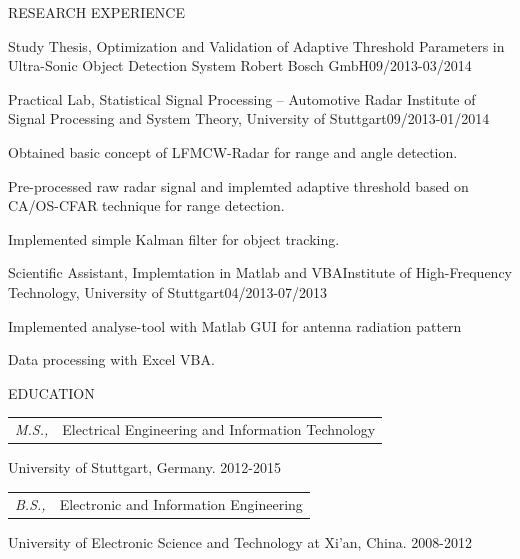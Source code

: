 \documentclass{resume} %
\begin{document}
\begin{rSection}{RESEARCH  EXPERIENCE}
\begin{rSubsection}{Study Thesis, Optimization and Validation of Adaptive Threshold Parameters in Ultra-Sonic Object Detection System 
}{}{Robert Bosch GmbH}{09/2013-03/2014}
\end{rSubsection}


\begin{rSubsection}{Practical Lab, Statistical Signal Processing – Automotive Radar
}{}{Institute of Signal Processing and System Theory, University of Stuttgart}{09/2013-01/2014}

\item Obtained basic concept of LFMCW-Radar for range and angle detection.
\item Pre-processed raw radar signal and implemted adaptive threshold based on CA/OS-CFAR technique for range detection.
\item Implemented simple Kalman filter for object tracking. 


\end{rSubsection}

\begin{rSubsection}{Scientific Assistant, Implemtation in Matlab and VBA}{}{Institute of High-Frequency Technology, University of Stuttgart}{04/2013-07/2013}

\item Implemented analyse-tool with Matlab GUI for antenna radiation pattern 
\item Data processing with Excel VBA.

\end{rSubsection}
\end{rSection}


\begin{rSection}{EDUCATION}
\begin{tabular}{l l}
 
{\sl M.S.,} & Electrical Engineering and Information Technology\\
\end{tabular}

University of Stuttgart, Germany. \hfill 2012-2015 \\

\begin{tabular}{l l}
{\sl B.S.,} & Electronic and Information Engineering\\
\end{tabular}

University of Electronic Science and Technology at Xi'an, China. \hfill  2008-2012\\



\end{rSection}
\end{document}
